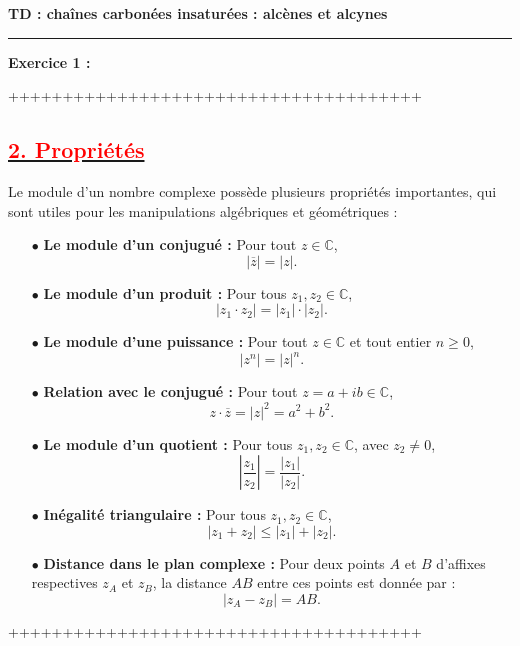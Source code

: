 \documentclass{article}
\begin{document}
\vspace*{2cm} %
\begin{center}
    \huge \textbf{TD : chaînes carbonées insaturées : alcènes et alcynes}
\end{center}

\noindent\rule{\textwidth}{0.4pt}

\begin{flushleft}
    \textbf{Exercice 1 :}
\end{flushleft}
++++++++++++++++++++++++++++++++++++++
 \subsection*{\underline{\textbf{\textcolor{red}{2. Propriétés}}}}

Le module d'un nombre complexe possède plusieurs propriétés importantes, qui sont utiles pour les manipulations algébriques et géométriques :

\begin{itemize}
  \item[$\bullet$] \textbf{Le module d'un conjugué :} Pour tout \(z \in \mathbb{C}\),
  \[
  |\overline{z}| = |z|.
  \]

  \item[$\bullet$] \textbf{Le module d'un produit :} Pour tous \(z_1, z_2 \in \mathbb{C}\),
  \[
  |z_1 \cdot z_2| = |z_1| \cdot |z_2|.
  \]

  \item[$\bullet$] \textbf{Le module d'une puissance :} Pour tout \(z \in \mathbb{C}\) et tout entier \(n \geq 0\),
  \[
  |z^n| = |z|^n.
  \]

  \item[$\bullet$] \textbf{Relation avec le conjugué :} Pour tout \(z = a + ib \in \mathbb{C}\),
  \[
  z \cdot \overline{z} = |z|^2 = a^2 + b^2.
  \]

  \item[$\bullet$] \textbf{Le module d'un quotient :} Pour tous \(z_1, z_2 \in \mathbb{C}\), avec \(z_2 \neq 0\),
  \[
  \left|\frac{z_1}{z_2}\right| = \frac{|z_1|}{|z_2|}.
  \]

  \item[$\bullet$] \textbf{Inégalité triangulaire :} Pour tous \(z_1, z_2 \in \mathbb{C}\),
  \[
  |z_1 + z_2| \leq |z_1| + |z_2|.
  \]

  \item[$\bullet$] \textbf{Distance dans le plan complexe :} Pour deux points \(A\) et \(B\) d’affixes respectives \(z_A\) et \(z_B\), la distance \(AB\) entre ces points est donnée par :
  \[
  |z_A - z_B| = AB.
  \]
\end{itemize}

++++++++++++++++++++++++++++++++++++++
\end{document}
